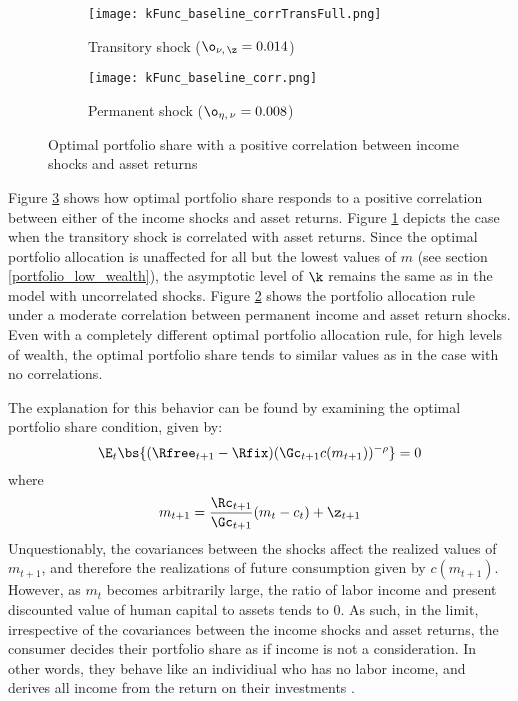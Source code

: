 \begin{figure}[h]
    \centering
    \begin{subfigure}{0.49\textwidth}
        \centering
        \texttt{[image: kFunc\_baseline\_corrTransFull.png]}
        \caption{Transitory shock ($\o_{\nu,\,\z} = 0.014$)}
        \label{subfig:correlated_baseline_transitory}
    \end{subfigure}
    \begin{subfigure}{0.49\textwidth}
        \centering
        \texttt{[image: kFunc\_baseline\_corr.png]}
        \caption{Permanent shock ($\o_{\eta,\,\nu} = 0.008$)}
        \label{subfig:correlated_baseline_permanent}
    \end{subfigure}
    \caption{Optimal portfolio share with a positive correlation between income shocks and asset returns}
    \label{fig:correlated_shock_baseline}
\end{figure}

Figure \ref{fig:correlated_shock_baseline} shows how optimal portfolio share responds to a positive correlation between either of the income shocks and asset returns. Figure \ref{subfig:correlated_baseline_transitory} depicts the case when the transitory shock is correlated with asset returns. Since the optimal portfolio allocation is unaffected for all but the lowest values of $m$ (see section \ref{portfolio_low_wealth}), the asymptotic level of $\k$ remains the same as in the model with uncorrelated shocks. Figure \ref{subfig:correlated_baseline_permanent} shows the portfolio allocation rule under a moderate correlation between permanent income and asset return shocks. Even with a completely different optimal portfolio allocation rule, for high levels of wealth, the optimal portfolio share tends to similar values as in the case with no correlations.

The explanation for this behavior can be found by examining the optimal portfolio share condition, given by:
\[
\E_{t}\bs{(\Rfree_{t+1} - \Rfix)(\Gc_{t+1}c(m_{t+1}))^{-\rho}} = 0
\]
where
\[
m_{t+1} = \frac{\Rc_{t+1}}{\Gc_{t+1}}(m_{t} - c_{t}) + \z_{t+1}
\]
Unquestionably, the covariances between the shocks affect the realized values of $m_{t+1}$, and therefore the realizations of future consumption given by $c(m_{t+1})$. However, as $m_{t}$ becomes arbitrarily large, the ratio of labor income and present discounted value of human capital to assets tends to 0. As such, in the limit, irrespective of the covariances between the income shocks and asset returns, the consumer decides their portfolio share as if income is not a consideration. In other words, they behave like an individiual who has no labor income, and derives all income from the return on their investments \citep{Carroll2024}.

